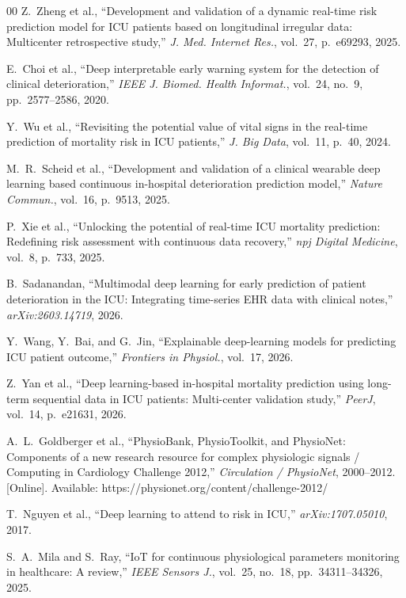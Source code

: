 \documentclass[a4paper,conference]{IEEEtran}
\begin{document}
\begin{thebibliography}{00}
 Z.~Zheng et al., ``Development and validation of a dynamic real-time risk prediction model for ICU patients based on longitudinal irregular data: Multicenter retrospective study,'' {\em J. Med. Internet Res.}, vol.~27, p.~e69293, 2025.

 E.~Choi et al., ``Deep interpretable early warning system for the detection of clinical deterioration,'' {\em IEEE J. Biomed. Health Informat.}, vol.~24, no.~9, pp.~2577--2586, 2020.

 Y.~Wu et al., ``Revisiting the potential value of vital signs in the real-time prediction of mortality risk in ICU patients,'' {\em J. Big Data}, vol.~11, p.~40, 2024.

 M.~R.~Scheid et al., ``Development and validation of a clinical wearable deep learning based continuous in-hospital deterioration prediction model,'' {\em Nature Commun.}, vol.~16, p.~9513, 2025.

 P.~Xie et al., ``Unlocking the potential of real-time ICU mortality prediction: Redefining risk assessment with continuous data recovery,'' {\em npj Digital Medicine}, vol.~8, p.~733, 2025.

 B.~Sadanandan, ``Multimodal deep learning for early prediction of patient deterioration in the ICU: Integrating time-series EHR data with clinical notes,'' {\em arXiv:2603.14719}, 2026.

 Y.~Wang, Y.~Bai, and G.~Jin, ``Explainable deep-learning models for predicting ICU patient outcome,'' {\em Frontiers in Physiol.}, vol.~17, 2026.

 Z.~Yan et al., ``Deep learning-based in-hospital mortality prediction using long-term sequential data in ICU patients: Multi-center validation study,'' {\em PeerJ}, vol.~14, p.~e21631, 2026.

 A.~L.~Goldberger et al., ``PhysioBank, PhysioToolkit, and PhysioNet: Components of a new research resource for complex physiologic signals / Computing in Cardiology Challenge 2012,'' {\em Circulation / PhysioNet}, 2000--2012. [Online]. Available: https://physionet.org/content/challenge-2012/

 T.~Nguyen et al., ``Deep learning to attend to risk in ICU,'' {\em arXiv:1707.05010}, 2017.

 S.~A.~Mila and S.~Ray, ``IoT for continuous physiological parameters monitoring in healthcare: A review,'' {\em IEEE Sensors J.}, vol.~25, no.~18, pp.~34311--34326, 2025.


\end{thebibliography}
\end{document}
